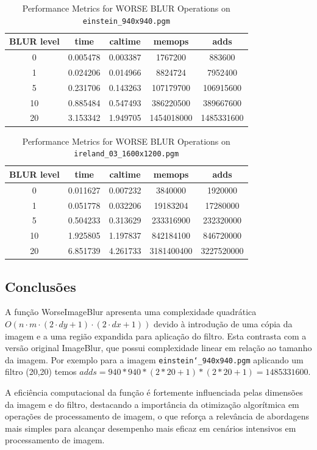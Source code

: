 \documentclass{report}
\begin{document}
\begin{table}[h]
    \centering
    \begin{tabular}{ccccc}
        \toprule
        \textbf{BLUR level} & \textbf{time} & \textbf{caltime} & \textbf{memops} & \textbf{adds} \\
        \midrule
        0 & 0.005478 & 0.003387 & 1767200 & 883600 \\
        1 & 0.024206 & 0.014966 & 8824724 & 7952400 \\
        5 & 0.231706 & 0.143263 & 107179700 & 106915600 \\
        10 & 0.885484 & 0.547493 & 386220500 & 389667600 \\
        20 & 3.153342 & 1.949705 & 1454018000 & 1485331600 \\
        \bottomrule
    \end{tabular}
    \caption*{Performance Metrics for WORSE BLUR Operations on \texttt{einstein\_940x940.pgm}}
\end{table}

\begin{table}[h]
    \centering
    \begin{tabular}{ccccc}
        \toprule
        \textbf{BLUR level} & \textbf{time} & \textbf{caltime} & \textbf{memops} & \textbf{adds} \\
        \midrule
        0 & 0.011627 & 0.007232 & 3840000 & 1920000 \\
        1 & 0.051778 & 0.032206 & 19183204 & 17280000 \\
        5 & 0.504233 & 0.313629 & 233316900 & 232320000 \\
        10 & 1.925805 & 1.197837 & 842184100 & 846720000 \\
        20 & 6.851739 & 4.261733 & 3181400400 & 3227520000 \\
        \bottomrule
    \end{tabular}
    \caption*{Performance Metrics for WORSE BLUR Operations on \texttt{ireland\_03\_1600x1200.pgm}}
\end{table}


\subsection{Conclusões}

A função WorseImageBlur apresenta uma complexidade quadrática \(O(n \cdot m \cdot (2 \cdot dy + 1) \cdot (2 \cdot dx + 1))\) devido à introdução de uma cópia da imagem e a uma região expandida para aplicação do filtro. Esta contrasta com a versão original ImageBlur, que possui complexidade linear em relação ao tamanho da imagem. Por exemplo para a imagem \texttt{einstein\char`_940x940.pgm} aplicando um filtro (20,20) temos \texttt{$adds = 940*940*(2*20+1)*(2*20+1) = 1485331600$}.
\par A eficiência computacional da função é fortemente influenciada pelas dimensões da imagem e do filtro, destacando a importância da otimização algorítmica em operações de processamento de imagem, o que reforça a relevância de abordagens mais simples para alcançar desempenho mais eficaz em cenários intensivos em processamento de imagem.
\end{document}
